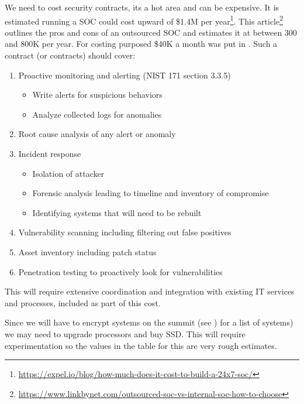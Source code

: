 



We need to cost security contracts, its a hot area and can be expensive.
It is estimated running a SOC could cost upward of \$1.4M per year\footnote{\url{https://expel.io/blog/how-much-does-it-cost-to-build-a-24x7-soc/}}.
This article\footnote{\url{https://www.linkbynet.com/outsourced-soc-vs-internal-soc-how-to-choose}} outlines the pros and cons of
an outsourced SOC and estimates it at between 300 and 800K per year.
For costing purposed  \$40K a month was put in .
Such a contract (or contracts) should cover:

\begin{enumerate}
\item Proactive monitoring and alerting (NIST 171 section 3.3.5)
  \begin{itemize}
  \item Write alerts for suspicious behaviors
  \item Analyze collected logs for anomalies
  \end{itemize}
\item Root cause analysis of any alert or anomaly
\item Incident response
  \begin{itemize}
  \item Isolation of attacker
  \item Forensic analysis leading to timeline and inventory of compromise
  \item Identifying systems that will need to be rebuilt
  \end{itemize}
\item Vulnerability scanning including filtering out false positives
\item Asset inventory including patch status
\item Penetration testing to proactively look for vulnerabilities
\end{enumerate}

This will require extensive coordination and integration with existing IT
services and processes, included as part of this cost.

Since we will have to encrypt systems on the summit (see ) for a list of systems)
we may need to upgrade processors and buy SSD. This will require experimentation so the
values in the table for this are very rough estimates.
